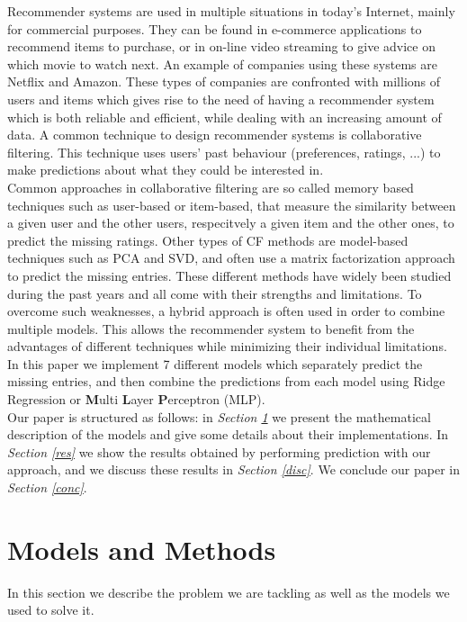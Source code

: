 \documentclass[10pt,conference,compsocconf]{IEEEtran}
\begin{document}
Recommender systems are used in multiple situations in today's Internet, mainly for commercial purposes. They can be found in e-commerce applications to recommend items to purchase, or in on-line video streaming to give advice on which movie to watch next. An example of companies using these systems are Netflix and Amazon. These types of companies are confronted with millions of users and items which gives rise to the need of having a recommender system which is both reliable and efficient, while dealing with an increasing amount of data. A common technique to design recommender systems is collaborative filtering. This technique uses users' past behaviour (preferences, ratings, ...) to make predictions about what they could be interested in.\\
Common approaches in collaborative filtering are so called memory based techniques such as user-based or item-based, that measure the similarity between a given user and the other users, respecitvely a given item and the other ones, to predict the missing ratings. Other types of CF methods are model-based techniques such as PCA and SVD, and often use a matrix factorization approach to predict the missing entries. These different methods have widely been studied during the past years and all come with their strengths and limitations. To overcome such weaknesses, a hybrid approach is often used in order to combine multiple models. This allows the recommender system to benefit from the advantages of different techniques while minimizing their individual limitations.\\
In this paper we implement 7 different models which separately predict the missing entries, and then combine the predictions from each model using Ridge Regression or \textbf{M}ulti \textbf{L}ayer \textbf{P}erceptron (MLP).\\
Our paper is structured as follows: in \emph{Section \ref{mam}} we present the mathematical description of the models and give some details about their implementations. In \emph{Section \ref{res}} we show the results obtained by performing prediction with our approach, and we discuss these results in \emph{Section \ref{disc}}. We conclude our paper in \emph{Section \ref{conc}}.

\section{Models and Methods}
\label{mam}

In this section we describe the problem we are tackling as well as the models we used to solve it.
\end{document}
